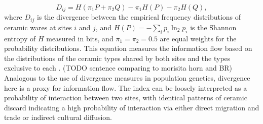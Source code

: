 \documentclass[11pt]{iopart}
\begin{document}
\begin{equation}
    D_{ij} = H\left(\pi_1P + \pi_2Q\right) - \pi_1H(P) - \pi_2H(Q),
\end{equation}
where $D_{ij}$ is the divergence between the empirical frequency distributions of ceramic wares at sites $i$ and $j$, and $H(P) = -\sum_i p_i \ln_2 p_i$ is the Shannon entropy of $H$ measured in bits, and $\pi_1 = \pi_2 = 0.5$ are equal weights for the probability distributions. This equation measures the information flow based on the distributions of the ceramic types shared by both sites and the types exclusive to each \parencite{Masucci2011}. (TODO sentence comparing to morisita horn and BR) Analogous to the use of divergence measures in population genetics, divergence here is a proxy for information flow. The index can be loosely interpreted as a probability of interaction between two sites, with identical patterns of ceramic discard indicating a high probability of interaction via either direct migration and trade or indirect cultural diffusion.
\end{document}
